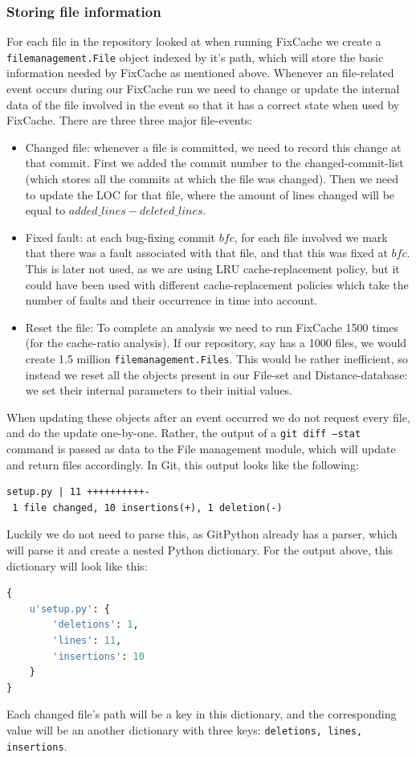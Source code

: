 \documentclass[12pt,twoside,notitlepage]{report}
\newcommand{\fxch}{FixCache}
\begin{document}
\subsubsection*{Storing file information}
For each file in the repository looked at when running \fxch{} we create a \texttt{filemanagement.File} object indexed by it's path, which will store the basic information needed by \fxch{} as mentioned above. Whenever an file-related event occurs during our \fxch{} run we need to change or update the internal data of the file involved in the event so that it has a correct state when used by \fxch{}. There are three three major file-events:
\begin{itemize}
\item Changed file: whenever a file is committed, we need to record this change at that commit. First we added the commit number to the changed-commit-list (which stores all the commits at which the file was changed). Then we need to update the LOC for that file, where the amount of lines changed will be equal to $added\_lines - deleted\_lines$.
\item Fixed fault: at each bug-fixing commit $bfc$, for each file involved we mark that there was a fault associated with that file, and that this was fixed at $bfc$. This is later not used, as we are using LRU cache-replacement policy, but it could have been used with different cache-replacement policies which take the number of faults and their occurrence in time into account.
\item Reset the file: To complete an analysis we need to run \fxch{} 1500 times (for the cache-ratio analysis). If our repository, say has a 1000 files, we would create 1.5 million \texttt{filemanagement.Files}. This would be rather inefficient, so instead we reset all the objects present in our File-set and Distance-database: we set their internal parameters to their initial values.
\end{itemize}

When updating these objects after an event occurred we do not request every file, and do the update one-by-one. Rather, the output of a \texttt{git diff --stat} command is passed as data to the File management module, which will update and return files accordingly. In Git, this output looks like the following:

\begin{lstlisting}
setup.py | 11 ++++++++++-
 1 file changed, 10 insertions(+), 1 deletion(-)
\end{lstlisting}
Luckily we do not need to parse this, as GitPython already has a parser, which will parse it and create a nested Python dictionary. For the output above, this dictionary will look like this:
\begin{lstlisting}[language=Python]
{ 
	u'setup.py': {
    	'deletions': 1,
	 	'lines': 11,
	 	'insertions': 10
	}
}
\end{lstlisting}
Each changed file's path will be a key in this dictionary, and the corresponding value will be an another dictionary with three keys: \texttt{deletions, lines, insertions}. 
\end{document}
